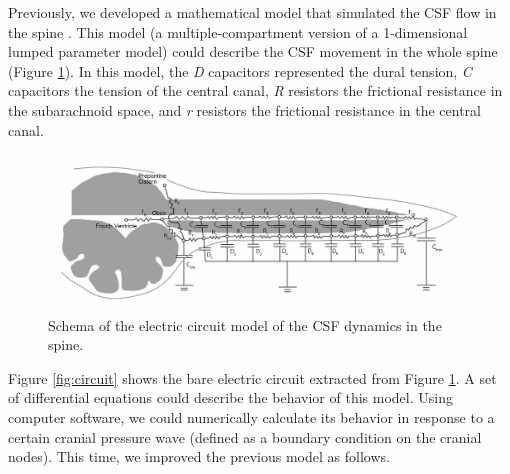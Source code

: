 \documentclass[fleqn,10pt]{wlscirep}
\begin{document}
Previously, we developed a mathematical model that simulated the CSF flow
in the spine \cite{chang2003hypothesis, chang2004theoretical}. This model (a
multiple-compartment version of a 1-dimensional lumped parameter model)
could describe the CSF movement in the whole spine (Figure
\ref{fig:model}). In this model, the \textit{D} capacitors represented the
dural tension, \textit{C} capacitors the tension of the central canal,
\textit{R} resistors the frictional resistance in the subarachnoid space,
and \textit{r} resistors the frictional resistance in the central canal.

\begin{figure}[ht]
    \centering
    \includegraphics[width=\textwidth]{ps_circuit_schema.jpg}
    \caption{Schema of the electric circuit model of the CSF dynamics in the
    spine.}
    \label{fig:model}
\end{figure}

Figure \ref{fig:circuit} shows the bare electric circuit extracted from
Figure \ref{fig:model}. A set of differential equations could describe the
behavior of this model.  Using computer software, we could numerically
calculate its behavior in response to a certain cranial pressure wave
(defined as a boundary condition on the cranial nodes). This time, we
improved the previous model as follows.
\end{document}
